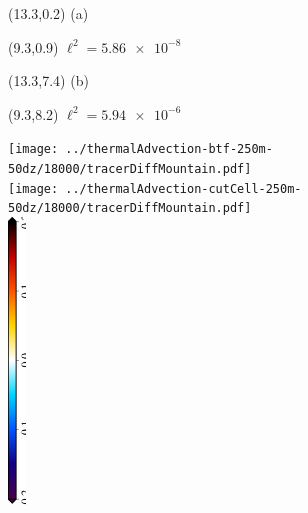 \documentclass{article}
\begin{document}
\TPMargin{3pt}
\begin{textblock}{1.5}(13.3,0.2)
\normalsize
\centering
(a)
\end{textblock}
\begin{textblock}{5.5}(9.3,0.9)
\normalsize
$\ell^2 = \num{5.86e-8}$
\end{textblock}
\begin{textblock}{1.5}(13.3,7.4)
\normalsize
\centering
(b)
\end{textblock}
\begin{textblock}{5.5}(9.3,8.2)
\normalsize
$\ell^2 = \num{5.94e-6}$
\end{textblock}
\centering
\texttt{[image: ../thermalAdvection-btf-250m-50dz/18000/tracerDiffMountain.pdf]} \\
\vspace*{0.1in}
\texttt{[image: ../thermalAdvection-cutCell-250m-50dz/18000/tracerDiffMountain.pdf]} \\
\includegraphics[height=3in,angle=270]{tracerDiffMountain_T_diff.eps}
\end{document}
